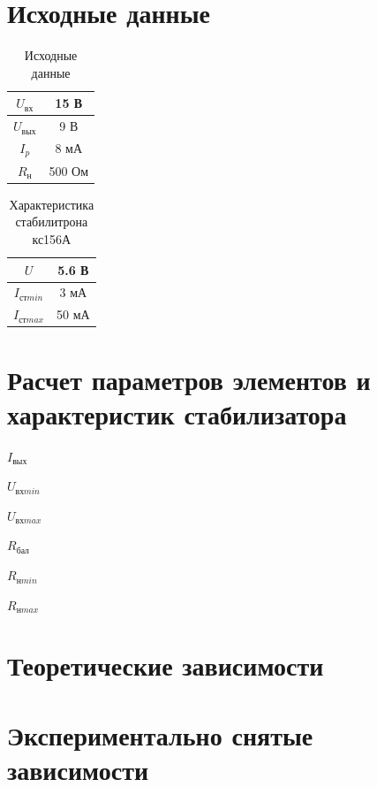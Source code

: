 \section{Исходные данные}

\begin{table}[H]
	\begin{center}
	\caption{Исходные данные}
	\def\arraystretch{1.2}
		\begin{tabular}{|c|c|}
		\hline 
		$U_\text{вх}$ & 15 В \\ 
		\hline 
		$U_\text{вых}$ & 9 В \\ 
		\hline 
		$I_p$ & 8 мА \\ 
		\hline 
		$R_\text{н}$ & 500 Ом \\ 
		\hline 
		\end{tabular} 
		\label{tab:3:1}
	\end{center}
\end{table}

\begin{table}[H]
	\begin{center}
	\caption{Характеристика стабилитрона кс156А}
	\def\arraystretch{1.2}
		\begin{tabular}{|c|c|}
		\hline 
		$U$ & 5.6 В \\ 
		\hline 
		$I_{\text{ст} min}$ & 3 мА \\ 
		\hline 
		$I_{\text{ст} max}$ & 50 мА \\ 
		\hline 
		\end{tabular} 
		\label{tab:3:1}
	\end{center}
\end{table}

\section{Расчет параметров элементов и характеристик стабилизатора}

$I_\text{вых}$

$U_{\text{вх} min}$

$U_{\text{вх} max}$

$R_\text{бал}$

$R_{\text{н} min}$

$R_{\text{н} max}$ 


\section{Теоретические зависимости}


\section{Экспериментально снятые зависимости}



